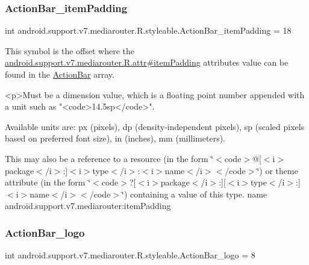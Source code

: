 \subsubsection{\texorpdfstring{Action\+Bar\+\_\+item\+Padding}{ActionBar\_itemPadding}}
{\footnotesize\ttfamily int android.\+support.\+v7.\+mediarouter.\+R.\+styleable.\+Action\+Bar\+\_\+item\+Padding = 18\hspace{0.3cm}{\ttfamily [static]}}

This symbol is the offset where the \hyperlink{classandroid_1_1support_1_1v7_1_1mediarouter_1_1R_1_1attr_a7fc8391afad02325065f1f8739e50024}{android.\+support.\+v7.\+mediarouter.\+R.\+attr\#item\+Padding} attribute\textquotesingle{}s value can be found in the \hyperlink{classandroid_1_1support_1_1v7_1_1mediarouter_1_1R_1_1styleable_adc4d3c0d096085367f12d025007aa53f}{Action\+Bar} array.

\begin{DoxyVerb}      <p>Must be a dimension value, which is a floating point number appended with a unit such as "<code>14.5sp</code>".
\end{DoxyVerb}
 Available units are\+: px (pixels), dp (density-\/independent pixels), sp (scaled pixels based on preferred font size), in (inches), mm (millimeters). 

This may also be a reference to a resource (in the form \char`\"{}$<$code$>$@\mbox{[}$<$i$>$package$<$/i$>$\+:\mbox{]}$<$i$>$type$<$/i$>$\+:$<$i$>$name$<$/i$>$$<$/code$>$\char`\"{}) or theme attribute (in the form \char`\"{}$<$code$>$?\mbox{[}$<$i$>$package$<$/i$>$\+:\mbox{]}\mbox{[}$<$i$>$type$<$/i$>$\+:\mbox{]}$<$i$>$name$<$/i$>$$<$/code$>$\char`\"{}) containing a value of this type.  name android.\+support.\+v7.\+mediarouter\+:item\+Padding \mbox{\label{classandroid_1_1support_1_1v7_1_1mediarouter_1_1R_1_1styleable_a8014c62055ea861d1382563e95509433}} 
\subsubsection{\texorpdfstring{Action\+Bar\+\_\+logo}{ActionBar\_logo}}
{\footnotesize\ttfamily int android.\+support.\+v7.\+mediarouter.\+R.\+styleable.\+Action\+Bar\+\_\+logo = 8\hspace{0.3cm}{\ttfamily [static]}}

